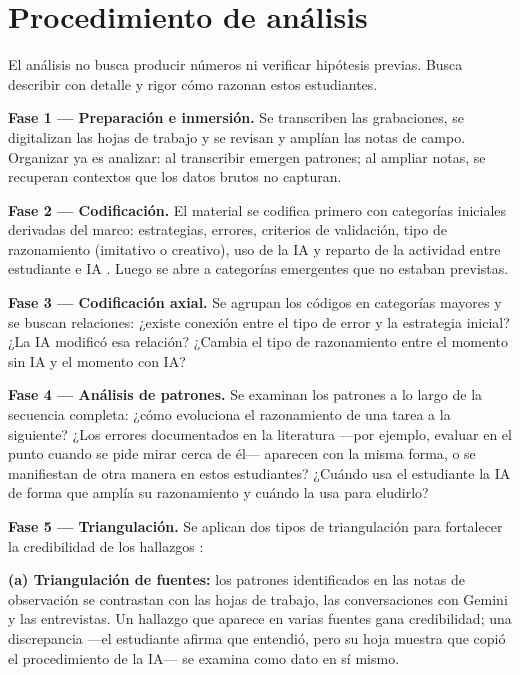 \section{Procedimiento de análisis}

El análisis no busca producir números ni verificar hipótesis previas. Busca describir con detalle y rigor cómo razonan estos estudiantes.

\textbf{Fase 1 --- Preparación e inmersión.} Se transcriben las grabaciones, se digitalizan las hojas de trabajo y se revisan y amplían las notas de campo. Organizar ya es analizar: al transcribir emergen patrones; al ampliar notas, se recuperan contextos que los datos brutos no capturan.

\textbf{Fase 2 --- Codificación.} El material se codifica primero con categorías iniciales derivadas del marco: estrategias, errores, criterios de validación, tipo de razonamiento (imitativo o creativo), uso de la IA y reparto de la actividad entre estudiante e IA \parencite{lithner2008framework,trouche2004managing}. Luego se abre a categorías emergentes que no estaban previstas.

\textbf{Fase 3 --- Codificación axial.} Se agrupan los códigos en categorías mayores y se buscan relaciones: ¿existe conexión entre el tipo de error y la estrategia inicial? ¿La IA modificó esa relación? ¿Cambia el tipo de razonamiento entre el momento sin IA y el momento con IA?

\textbf{Fase 4 --- Análisis de patrones.} Se examinan los patrones a lo largo de la secuencia completa: ¿cómo evoluciona el razonamiento de una tarea a la siguiente? ¿Los errores documentados en la literatura ---por ejemplo, evaluar en el punto cuando se pide mirar cerca de él--- aparecen con la misma forma, o se manifiestan de otra manera en estos estudiantes? ¿Cuándo usa el estudiante la IA de forma que amplía su razonamiento y cuándo la usa para eludirlo?

\textbf{Fase 5 --- Triangulación.} Se aplican dos tipos de triangulación para fortalecer la credibilidad de los hallazgos \parencite{creswell2014research}:

\textbf{(a) Triangulación de fuentes:} los patrones identificados en las notas de observación se contrastan con las hojas de trabajo, las conversaciones con Gemini y las entrevistas. Un hallazgo que aparece en varias fuentes gana credibilidad; una discrepancia ---el estudiante afirma que entendió, pero su hoja muestra que copió el procedimiento de la IA--- se examina como dato en sí mismo.

